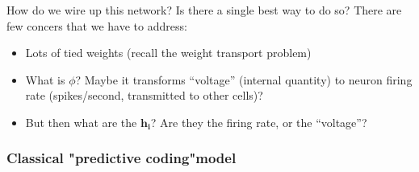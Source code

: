 \documentclass[main]{subfiles}
\begin{document}
How do we wire up this network? Is there a single best way to do so? There are few concers that we have to address:
\begin{itemize}
    \item Lots of tied weights (recall the weight transport problem)
    \item What is $\phi$? Maybe it transforms “voltage” (internal quantity) to neuron firing rate (spikes/second, transmitted to other cells)?
    \item But then what are the $\bm{h_i}$? Are they the firing rate, or the “voltage”?
\end{itemize}

\subsubsection{Classical "predictive coding"model}
\end{document}
